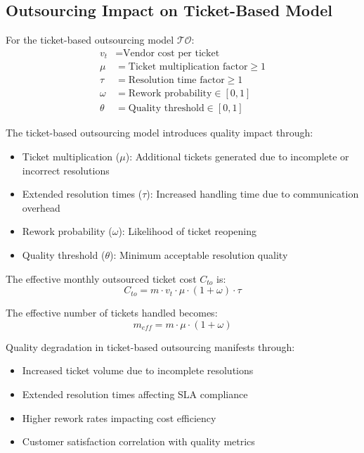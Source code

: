 \documentclass[12pt,a4paper]{article}
\newenvironment{definition}[1]
{\begin{mdframed}[style=definitionstyle,frametitle={Definition: #1}]}
{\end{mdframed}}
\newenvironment{explanation}
{\begin{mdframed}[style=explanationstyle,frametitle={Explanation}]}
{\end{mdframed}}
\newenvironment{observation}
{\begin{mdframed}[style=observationstyle,frametitle={Observation}]}
{\end{mdframed}}
\begin{document}
\subsection{Outsourcing Impact on Ticket-Based Model}
\begin{definition}{Ticket Outsourcing Variables}
For the ticket-based outsourcing model $\mathcal{TO}$:
\begin{align*}
    v_t &= \text{Vendor cost per ticket} \\
    \mu &= \text{Ticket multiplication factor} \geq 1 \\
    \tau &= \text{Resolution time factor} \geq 1 \\
    \omega &= \text{Rework probability} \in [0,1] \\
    \theta &= \text{Quality threshold} \in [0,1]
\end{align*}
\end{definition}

\begin{explanation}
The ticket-based outsourcing model introduces quality impact through:
\begin{itemize}
    \item Ticket multiplication ($\mu$): Additional tickets generated due to incomplete or incorrect resolutions
    \item Extended resolution times ($\tau$): Increased handling time due to communication overhead
    \item Rework probability ($\omega$): Likelihood of ticket reopening
    \item Quality threshold ($\theta$): Minimum acceptable resolution quality
\end{itemize}
\end{explanation}

\begin{definition}{Outsourced Ticket Cost}
The effective monthly outsourced ticket cost $C_{to}$ is:
\begin{equation}
    C_{to} = m \cdot v_t \cdot \mu \cdot (1 + \omega) \cdot \tau
\end{equation}

The effective number of tickets handled becomes:
\begin{equation}
    m_{eff} = m \cdot \mu \cdot (1 + \omega)
\end{equation}
\end{definition}

\begin{observation}
Quality degradation in ticket-based outsourcing manifests through:
\begin{itemize}
    \item Increased ticket volume due to incomplete resolutions
    \item Extended resolution times affecting SLA compliance
    \item Higher rework rates impacting cost efficiency
    \item Customer satisfaction correlation with quality metrics
\end{itemize}
\end{observation}
\end{document}
